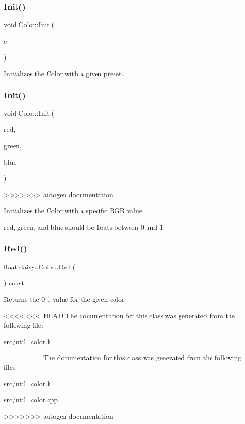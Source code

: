 \subsubsection{\texorpdfstring{Init()}{Init()}\hspace{0.1cm}{\footnotesize\ttfamily [1/2]}}
{\footnotesize\ttfamily void Color\+::\+Init (\begin{DoxyParamCaption}\item[{\hyperlink{classdaisy_1_1_color_af93d31d5fc63705c228bf9da407c9a40}{Preset\+Color}}]{c }\end{DoxyParamCaption})}

Initializes the \hyperlink{classdaisy_1_1_color}{Color} with a given preset. \mbox{\label{classdaisy_1_1_color_a7ed62acfe4093fc477e860bd2b21dbaa}} 
\subsubsection{\texorpdfstring{Init()}{Init()}\hspace{0.1cm}{\footnotesize\ttfamily [2/2]}}
{\footnotesize\ttfamily void Color\+::\+Init (\begin{DoxyParamCaption}\item[{float}]{red,  }\item[{float}]{green,  }\item[{float}]{blue }\end{DoxyParamCaption})}
>>>>>>> autogen documentation

Initializes the \hyperlink{classdaisy_1_1_color}{Color} with a specific R\+GB value

red, green, and blue should be floats between 0 and 1 \mbox{\label{classdaisy_1_1_color_ab645aa34a553a044e9c901546e78ed8f}} 
\subsubsection{\texorpdfstring{Red()}{Red()}}
{\footnotesize\ttfamily float daisy\+::\+Color\+::\+Red (\begin{DoxyParamCaption}{ }\end{DoxyParamCaption}) const\hspace{0.3cm}{\ttfamily [inline]}}

Returns the 0-\/1 value for the given color 

<<<<<<< HEAD
The documentation for this class was generated from the following file\+:\begin{DoxyCompactItemize}
\item 
src/util\+\_\+color.\+h\end{DoxyCompactItemize}
=======
The documentation for this class was generated from the following files\+:\begin{DoxyCompactItemize}
\item 
src/util\+\_\+color.\+h\item 
src/util\+\_\+color.\+cpp\end{DoxyCompactItemize}
>>>>>>> autogen documentation
